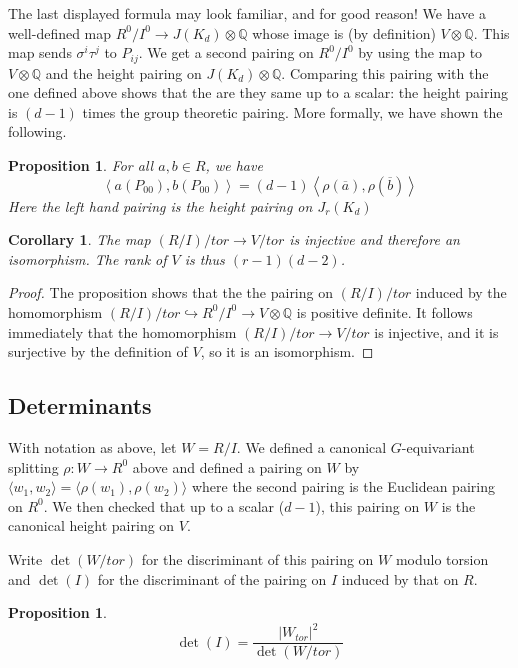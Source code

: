 \documentclass[reqno]{amsart}
\newtheorem{cor}[thm]{Corollary}
\newtheorem{prop}[thm]{Proposition}
\theoremstyle{definition}
\theoremstyle{remark}
\def\Q{\mathbb{Q}}
\def\into{\hookrightarrow}
\def\tensor{\otimes}
\begin{document}
The last displayed formula may look familiar, and for good reason!  We
have a well-defined map $R^0/I^0\to J(K_d)\tensor\Q$ whose image is
(by definition) $V\tensor\Q$. This map sends $\sigma^i\tau^j$ to
$P_{ij}$.  We get a second pairing on $R^0/I^0$ by using the map to
$V\tensor\Q$ and the height pairing on $J(K_d)\tensor\Q$.  Comparing
this pairing with the one defined above shows that the are they same
up to a scalar: the height pairing is $(d-1)$ times the group
theoretic pairing.  More formally, we have shown the following.

\begin{prop}\label{prop:pairings}
For all $a,b\in R$, we have
$$\left\langle a(P_{00}),b(P_{00})\right\rangle = (d-1)\left\langle\rho(\overline{a}),\rho(\overline{b})\right\rangle$$
Here the left hand pairing is the height pairing on $J_r(K_d)$
\end{prop}

\begin{cor}\label{cor:rank-lower-bound}
  The map $(R/I)/tor\to V/tor$ is
  injective and therefore an isomorphism.  The rank of
  $V$ is thus $(r-1)(d-2)$.
\end{cor}

\begin{proof}
  The proposition shows that the the pairing on $(R/I)/tor$ induced by
  the homomorphism $(R/I)/tor\into R^0/I^0\to V\tensor\Q$ is positive
  definite.  It follows immediately that the homomorphism
  $(R/I)/tor\to V/tor$ is injective, and it is surjective by the
  definition of $V$, so it is an isomorphism.
\end{proof}


\subsection{Determinants}
With notation as above, let $W=R/I$.  We defined a canonical
$G$-equivariant splitting $\rho:W\to R^0$ above and
defined a pairing on $W$ by $\langle w_1,w_2\rangle=\langle
\rho(w_1),\rho(w_2)\rangle$ where the second pairing is the
Euclidean pairing on $R^0$.  We then checked that up to a scalar
($d-1$), this pairing on $W$ is the canonical height pairing on $V$.

Write $\det(W/tor)$ for the discriminant of this pairing on $W$ modulo
torsion and $\det(I)$ for the discriminant of the pairing on $I$
induced by that on $R$.

\begin{prop}
$$\det(I)=\frac{|W_{tor}|^2}{\det(W/tor)}$$
\end{prop}
\end{document}
